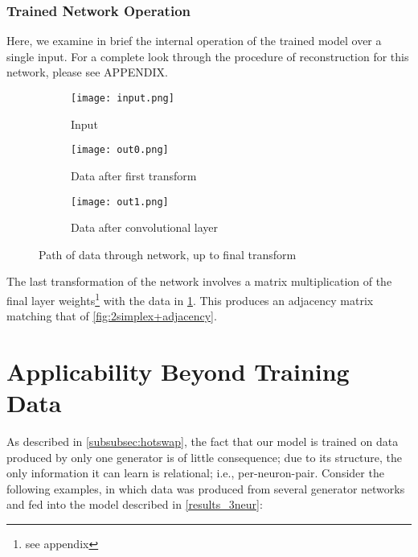 \subsubsection{Trained Network Operation}
Here, we examine in brief the internal operation of the trained model over a 
single input. For a complete look through the procedure of reconstruction for 
this network, please see APPENDIX.
\begin{figure}[h]
	\centering
	\begin{subfigure}{.15\textwidth}
		\centering
		\texttt{[image: input.png]}
		\caption{Input}
	\end{subfigure}
	\hspace{1em}
	\begin{subfigure}{.3\textwidth}
		\texttt{[image: out0.png]}
		\caption{Data after first transform}
	\end{subfigure}
	\hspace{1em}
	\begin{subfigure}{.3\textwidth}
		\texttt{[image: out1.png]}
		\caption{Data after convolutional layer}
		\label{subfig:3neur_out1}
	\end{subfigure}
	\caption{Path of data through network, up to final transform}
	\label{fig:3neur_input}
\end{figure}

The last transformation of the network involves a matrix multiplication of the 
final layer weights\footnote{see appendix} with the data in 
\ref{subfig:3neur_out1}. This produces an adjacency matrix matching that of 
\ref{fig:2simplex+adjacency}.

\section{Applicability Beyond Training Data}
As described in \ref{subsubsec:hotswap}, the fact that our model is trained on 
data produced by only one generator is of little consequence; due to its 
structure, the only information it can learn is relational; i.e., 
per-neuron-pair. Consider the following examples, in which data was produced 
from several generator networks and fed into the model described in 
\ref{results_3neur}:

